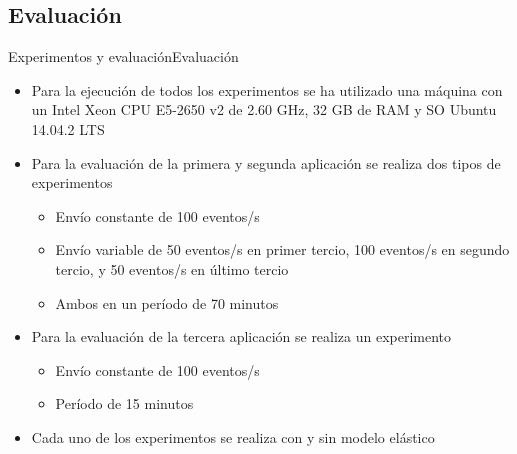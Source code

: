 \subsection*{Evaluación}
\begin{frame}{Experimentos y evaluación}{Evaluación}
\begin{itemize}
\item Para la ejecución de todos los experimentos se ha utilizado una máquina con un Intel Xeon CPU E5-2650 v2 de 2.60 GHz, 32 GB de RAM y SO Ubuntu 14.04.2 LTS

\item Para la evaluación de la primera y segunda aplicación se realiza dos tipos de experimentos
\begin{itemize}
\item Envío constante de 100 eventos/s
\item Envío variable de 50 eventos/s en primer tercio, 100 eventos/s en segundo tercio, y 50 eventos/s en último tercio
\item Ambos en un período de 70 minutos
\end{itemize}

\item Para la evaluación de la tercera aplicación se realiza un experimento
\begin{itemize}
	\item Envío constante de 100 eventos/s
	\item Período de 15 minutos
\end{itemize}

\item Cada uno de los experimentos se realiza con y sin modelo elástico

\end{itemize}
\end{frame}


